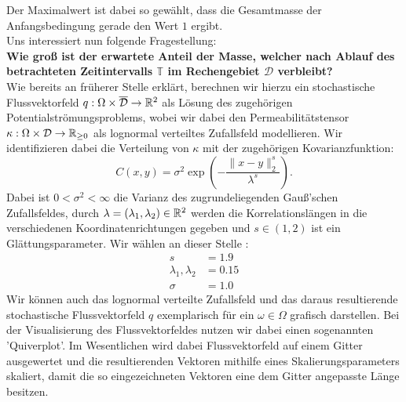 Der Maximalwert ist dabei so gewählt, dass die Gesamtmasse der Anfangsbedingung gerade den Wert $ 1 $ ergibt.\\
Uns interessiert nun folgende Fragestellung: \\
\textbf{Wie groß ist der erwartete Anteil der Masse, welcher nach Ablauf des betrachteten Zeitintervalls $ \mathbb{T} $ im Rechengebiet $ \mathcal{D} $ verbleibt?}\\

Wie bereits an früherer Stelle erklärt, berechnen wir hierzu ein stochastische Flussvektorfeld $ q : \Omega \times \overline{\mathcal{ D}} \to \mathbb{R}^2 $ als Lösung des zugehörigen Potentialströmungsproblems, wobei wir dabei den Permeabilitätstensor $ \kappa : \Omega \times \mathcal{D} \to \mathbb{R}_{\geq0} $ als lognormal verteiltes Zufallsfeld modellieren. Wir identifizieren dabei die Verteilung von $ \kappa $ mit der zugehörigen Kovarianzfunktion:
\[
 C(x,y) = \sigma^2 \exp(- \frac{\lVert x-y \rVert_2^s}{\lambda^s} ) .
\]
Dabei ist $ 0 < \sigma^2 < \infty $ die Varianz des zugrundeliegenden Gauß'schen Zufallsfeldes, durch $ \lambda = (\lambda_1,\lambda_2) \in \mathbb{R}^2 $ werden die Korrelationslängen in die verschiedenen Koordinatenrichtungen gegeben und $ s \in (1,2) $ ist ein Glättungsparameter. Wir wählen an dieser Stelle :
\begin{align*}
s &=  1.9\\
\lambda_1,\lambda_2 &= 0.15\\
\sigma &= 1.0
\end{align*}
Wir können auch das lognormal verteilte Zufallsfeld und das daraus resultierende stochastische Flussvektorfeld $ q $ exemplarisch für ein $ \omega \in \Omega $ grafisch darstellen. Bei der Visualisierung des Flussvektorfeldes nutzen wir dabei einen sogenannten 'Quiverplot'. Im Wesentlichen wird dabei Flussvektorfeld auf einem Gitter ausgewertet und die resultierenden Vektoren mithilfe eines Skalierungsparameters skaliert, damit die so eingezeichneten Vektoren eine dem Gitter angepasste Länge besitzen.

